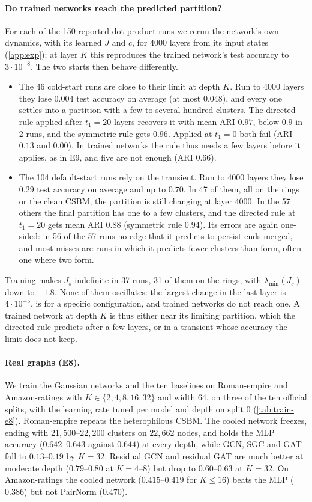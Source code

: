 \documentclass[10pt]{article}
\theoremstyle{definition}
\theoremstyle{remark}
\begin{document}
\paragraph{Do trained networks reach the predicted partition?} For each of the 150 reported dot-product runs we rerun the network's own dynamics,
with its learned $J$ and $c$, for 4000 layers from its input states (\cref{app:exp}); at layer $K$ this reproduces the trained network's test
accuracy to $3\cdot10^{-8}$. The two starts then behave differently.
\begin{itemize}
\item The 46 cold-start runs are close to their limit at depth $K$. Run to 4000 layers they lose $0.004$ test accuracy on average (at most
$0.048$), and every one settles into a partition with a few to several hundred clusters. The directed rule applied after $t_1=20$ layers
recovers it with mean ARI $0.97$, below $0.9$ in 2 runs, and the symmetric rule gets $0.96$. Applied at $t_1=0$ both fail (ARI $0.13$
and $0.00$). In trained networks the rule thus needs a few layers before it applies, as in E9, and five are not enough (ARI $0.66$).
\item The 104 default-start runs rely on the transient. Run to 4000 layers they lose $0.29$ test accuracy on average and up to $0.70$. In
47 of them, all on the rings or the clean CSBM, the partition is still changing at layer 4000. In the 57 others the final partition has one to
a few clusters, and the directed rule at $t_1=20$ gets mean ARI $0.88$ (symmetric rule $0.94$). Its errors are again one-sided: in 56 of the
57 runs no edge that it predicts to persist ends merged, and most misses are runs in which it predicts fewer clusters than form, often one where two form.
\end{itemize}
Training makes $J_s$ indefinite in 37 runs, 31 of them on the rings, with $\lambda_{\min}(J_s)$ down to $-1.8$. None of them oscillates: the
largest change in the last layer is $4\cdot10^{-5}$.  is for a specific configuration, and trained networks do not
reach one. A trained network at depth $K$ is thus either near its limiting partition, which the directed rule predicts after a few
layers, or in a transient whose accuracy the limit does not keep.

\paragraph{Real graphs (E8).} We train the Gaussian networks and the ten baselines on Roman-empire and Amazon-ratings with $K\in\{2,4,8,16,32\}$ and width 64, on
three of the ten official splits, with the learning rate tuned per model and depth on split 0 (\cref{tab:train-e8}). Roman-empire repeats
the heterophilous CSBM. The cooled network freezes, ending with $21{,}500$--$22{,}200$ clusters on $22{,}662$ nodes, and holds the MLP
accuracy ($0.642$--$0.643$ against $0.644$) at every depth, while GCN, SGC and GAT fall to $0.13$--$0.19$ by $K=32$. Residual GCN and residual
GAT are much better at moderate depth ($0.79$--$0.80$ at $K=4$--$8$) but drop to $0.60$--$0.63$ at $K=32$. On Amazon-ratings the cooled
network ($0.415$--$0.419$ for $K\le16$) beats the MLP ($0.386$) but not PairNorm ($0.470$).
\end{document}
